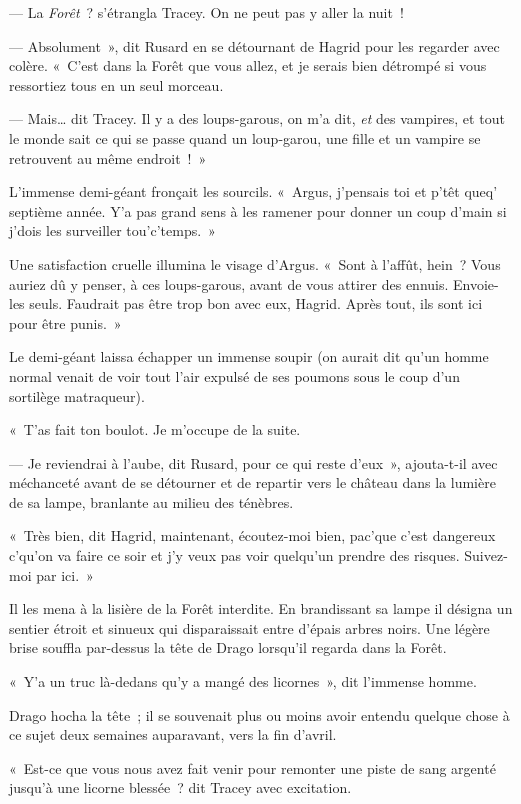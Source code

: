 --- La \emph{Forêt}~? s'étrangla Tracey.
On ne peut pas y aller la nuit~!

--- Absolument~», dit Rusard en se détournant de Hagrid pour les regarder avec colère.
«~C'est dans la Forêt que vous allez, et je serais bien détrompé si vous ressortiez tous en un seul morceau.

--- Mais… dit Tracey.
Il y a des loups-garous, on m'a dit, \emph{et} des vampires, et tout le monde sait ce qui se passe quand un loup-garou, une fille et un vampire se retrouvent au même endroit~!~»

L'immense demi-géant fronçait les sourcils.
«~Argus, j'pensais toi et p'têt queq' septième année.
Y'a pas grand sens à les ramener pour donner un coup d'main si j'dois les surveiller tou'c'temps.~»

Une satisfaction cruelle illumina le visage d'Argus.
«~Sont à l'affût, hein~?
Vous auriez dû y penser, à ces loups-garous, avant de vous attirer des ennuis.
Envoie-les seuls.
Faudrait pas être trop bon avec eux, Hagrid.
Après tout, ils sont ici pour être punis.~»

Le demi-géant laissa échapper un immense soupir (on aurait dit qu'un homme normal venait de voir tout l'air expulsé de ses poumons sous le coup d'un sortilège matraqueur).

«~T'as fait ton boulot.
Je m'occupe de la suite.

--- Je reviendrai à l'aube, dit Rusard, pour ce qui reste d'eux~», ajouta-t-il avec méchanceté avant de se détourner et de repartir vers le château dans la lumière de sa lampe, branlante au milieu des ténèbres.

«~Très bien, dit Hagrid, maintenant, écoutez-moi bien, pac'que c'est dangereux c'qu'on va faire ce soir et j'y veux pas voir quelqu'un prendre des risques.
Suivez-moi par ici.~»

Il les mena à la lisière de la Forêt interdite.
En brandissant sa lampe il désigna un sentier étroit et sinueux qui disparaissait entre d'épais arbres noirs.
Une légère brise souffla par-dessus la tête de Drago lorsqu'il regarda dans la Forêt.

«~Y'a un truc là-dedans qu'y a mangé des licornes~», dit l'immense homme.

Drago hocha la tête~; il se souvenait plus ou moins avoir entendu quelque chose à ce sujet deux semaines auparavant, vers la fin d'avril.

«~Est-ce que vous nous avez fait venir pour remonter une piste de sang argenté jusqu'à une licorne blessée~? dit Tracey avec excitation.

